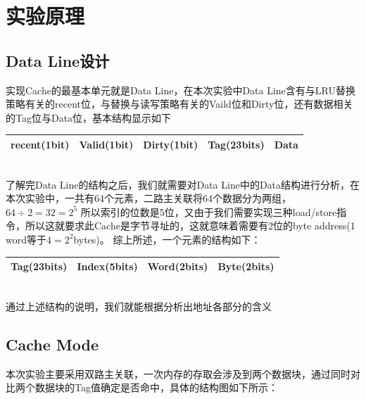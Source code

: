 
\section{实验原理}
\subsection{Data Line设计}
实现Cache的最基本单元就是Data Line，在本次实验中Data Line含有与LRU替换策略有关的recent位，与替换与读写策略有关的Vaild位和Dirty位，还有数据相关的Tag位与Data位，基本结构显示如下\\

\begin{tabular}{|c|c|c|c|c|}
    \hline
    recent(1bit) & Valid(1bit) & Dirty(1bit) & Tag(23bits) & Data \\
    \hline
\end{tabular} \\

了解完Data Line的结构之后，我们就需要对Data Line中的Data结构进行分析，在本次实验中，一共有64个元素，二路主关联将64个数据分为两组，$64 \div 2 = 32 = 2^5$
所以索引的位数是5位，又由于我们需要实现三种load/store指令，所以这就要求此Cache是字节寻址的，这就意味着需要有2位的byte address(1 word等于$4 = 2 ^ 2$bytes)。 
综上所述，一个元素的结构如下：

\begin{tabular}{|c|c|c|c|}
    \hline
    Tag(23bits) & Index(5bits) & Word(2bits) & Byte(2bits) \\
    \hline
\end{tabular} \\

通过上述结构的说明，我们就能根据分析出地址各部分的含义 \\

\subsection{Cache Mode}
本次实验主要采用双路主关联，一次内存的存取会涉及到两个数据块，通过同时对比两个数据块的Tag值确定是否命中，具体的结构图如下所示：

